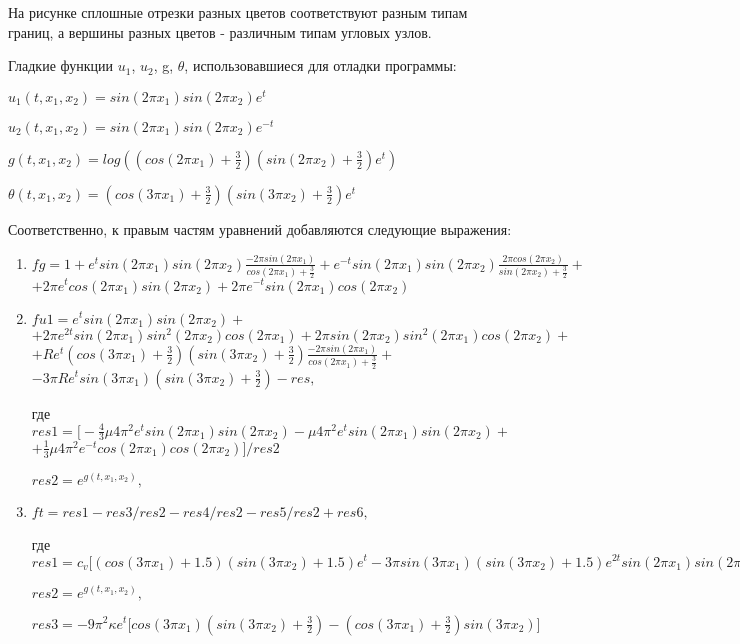 \documentclass[a4paper]{article}
\theoremstyle{definition}
\numberwithin{equation}{section}
\begin{document}
На рисунке сплошные отрезки разных цветов соответствуют разным типам границ, а вершины разных цветов - различным типам угловых узлов.
 
Гладкие функции $u_1$, $u_2$, g, $\theta$, использовавшиеся для отладки программы:

$u_1(t,x_1,x_2)=sin(2\pi x_1)sin(2\pi x_2) e^t$

$u_2(t,x_1,x_2)=sin(2\pi x_1)sin(2\pi x_2) e^{-t}$

$g(t,x_1,x_2)=log((cos(2\pi x_1)+\frac{3}{2})(sin(2\pi x_2)+\frac{3}{2})e^t)$

$\theta(t,x_1,x_2)=(cos(3\pi x_1)+\frac{3}{2})(sin(3\pi x_2)+\frac{3}{2})e^t$

Соответственно, к правым частям уравнений добавляются следующие выражения:
\begin{enumerate}
\item
$fg = 1 + e^t sin(2\pi x_1)sin(2\pi x_2)\frac{-2\pi sin(2\pi x_1)}{cos(2\pi x_1) + \frac{3}{2}} + e^{-t} sin(2\pi x_1)sin(2\pi x_2)\frac{2\pi cos(2\pi x_2)}{sin(2\pi x_2) + \frac{3}{2}} +$\\ 
$+ 2\pi e^t cos(2\pi x_1)sin(2\pi x_2) + 2\pi e^{-t}sin(2\pi x_1)cos(2\pi x_2)$
\item
$fu1 = e^t sin(2\pi x_1)sin(2\pi x_2) + $\\
$+ 2\pi e^{2t}sin(2\pi x_1) sin^2(2\pi x_2)cos(2\pi x_1) + 2\pi sin(2\pi x_2) sin^2(2\pi x_1)cos(2\pi x_2) +$\\
$+ Re^t(cos(3\pi x_1)+\frac{3}{2})(sin(3\pi x_2)+\frac{3}{2})\frac{-2\pi sin(2\pi x_1)}{cos(2\pi x_1)+\frac{3}{2}} +$\\
$- 3\pi Re^t sin(3\pi x_1)(sin(3\pi x_2)+\frac{3}{2}) - res,$

где $res1 = \big[ -\frac{4}{3}\mu 4\pi^2 e^t sin(2\pi x_1)sin(2\pi x_2) - \mu 4\pi^2 e^t sin(2\pi x_1)sin(2\pi x_2) +$\\
$+ \frac{1}{3}\mu 4\pi^2 e^{-t} cos(2\pi x_1)cos(2\pi x_2) \big]/res2$

$res2 = e^{g(t,x_1,x_2)},$
\item
$ft = res1-res3/res2-res4/res2 - res5/res2 +res6,$

где $res1 = c_v\big[ (cos(3\pi x_1)+1.5)(sin(3\pi x_2)+1.5)e^t - 3\pi sin(3\pi x_1)(sin(3\pi x_2)+1.5)e^{2t}sin(2\pi x_1)sin(2\pi x_2) + 3\pi(cos(3\pi x_1)+1.5)cos(3\pi x_2)sin(2\pi x_1)sin(2\pi x_2) \big],$

$res2 = e^{g(t,x_1,x_2)},$

$res3 = -9\pi^2\kappa e^t\big[ cos(3\pi x_1)(sin(3\pi x_2)+\frac{3}{2}) - (cos(3\pi x_1)+\frac{3}{2})sin(3\pi x_2) \big]$


\end{enumerate}
\end{document}
